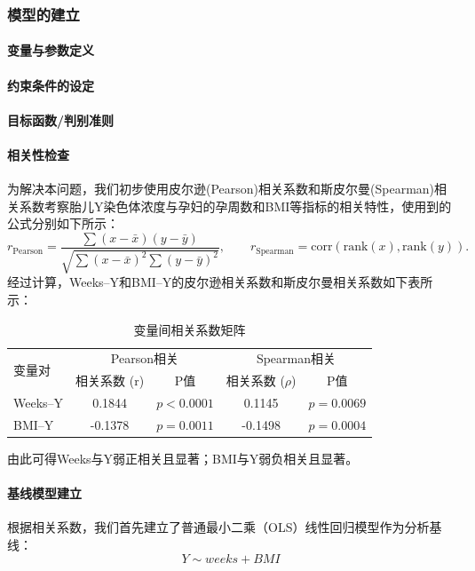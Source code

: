 \documentclass[withoutpreface]{cumcmthesis}
\begin{document}
\subsubsection{模型的建立}
\paragraph{变量与参数定义}
\paragraph{约束条件的设定}
\paragraph{目标函数/判别准则}
\paragraph{相关性检查}
为解决本问题，我们初步使用皮尔逊(Pearson)相关系数和斯皮尔曼(Spearman)相关系数考察胎儿Y染色体浓度与孕妇的孕周数和BMI等指标的相关特性，使用到的公式分别如下所示：
$$
r_{\text{Pearson}}=\frac{\sum (x-\bar x)(y-\bar y)}{\sqrt{\sum(x-\bar x)^2\sum(y-\bar y)^2}},\qquad
r_{\text{Spearman}}=\text{corr}(\text{rank}(x),\text{rank}(y)).
$$
经过计算，Weeks–Y和BMI–Y的皮尔逊相关系数和斯皮尔曼相关系数如下表所示：

\begin{table}[htbp]
  \centering
  \caption{变量间相关系数矩阵}
  \label{tab:correlation}
  \begin{tabular}{lcccc}
    \toprule
    \multirow{2}{*}{变量对} & \multicolumn{2}{c}{Pearson相关} & \multicolumn{2}{c}{Spearman相关} \\
    \cmidrule(lr){2-3} \cmidrule(lr){4-5}
    & 相关系数 (r) & P值 & 相关系数 ($\rho$) & P值 \\
    \midrule
    Weeks–Y & 0.1844 & $p < 0.0001$ & 0.1145 & $p = 0.0069$ \\
    BMI–Y  & -0.1378 & $p = 0.0011$ & -0.1498 & $p = 0.0004$ \\
    \bottomrule
  \end{tabular}
\end{table}

由此可得Weeks与Y弱正相关且显著；BMI与Y弱负相关且显著。

\paragraph{基线模型建立}
根据相关系数，我们首先建立了普通最小二乘（OLS）线性回归模型作为分析基线：
$$
Y \sim weeks + BMI
$$
\end{document}
